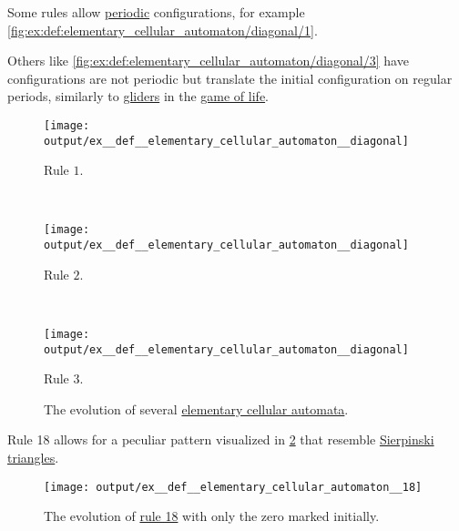 \begin{example}
\begin{thmenum}
     Some rules allow \hyperref[def:dynamical_system_periodicity]{periodic} configurations, for example \cref{fig:ex:def:elementary_cellular_automaton/diagonal/1}.

    Others like \cref{fig:ex:def:elementary_cellular_automaton/diagonal/3} have configurations are not periodic but translate the initial configuration on regular periods, similarly to \hyperref[ex:def:game_of_life/glider]{gliders} in the \hyperref[def:game_of_life]{game of life}.

    \begin{figure}[!ht]
      \begin{subcaptionblock}{\textwidth}
        \centering
        \texttt{[image: output/ex\_\_def\_\_elementary\_cellular\_automaton\_\_diagonal]}
        \caption{Rule \( 1 \).}\label{fig:ex:def:elementary_cellular_automaton/diagonal/1}
      \end{subcaptionblock}
      \\[\baselineskip]
      \begin{subcaptionblock}{\textwidth}
        \centering
        \texttt{[image: output/ex\_\_def\_\_elementary\_cellular\_automaton\_\_diagonal]}
        \caption{Rule \( 2 \).}\label{fig:ex:def:elementary_cellular_automaton/diagonal/2}
      \end{subcaptionblock}
      \\[\baselineskip]
      \begin{subcaptionblock}{\textwidth}
        \centering
        \texttt{[image: output/ex\_\_def\_\_elementary\_cellular\_automaton\_\_diagonal]}
        \caption{Rule \( 3 \).}\label{fig:ex:def:elementary_cellular_automaton/diagonal/3}
      \end{subcaptionblock}
      \caption{The evolution of several \hyperref[def:elementary_cellular_automaton]{elementary cellular automata}.}\label{fig:ex:def:elementary_cellular_automaton/diagonal}
    \end{figure}

     Rule 18 allows for a peculiar pattern visualized in \cref{fig:ex:def:elementary_cellular_automaton/18} that resemble \hyperref[def:sierpinski_triangle]{Sierpinski triangles}.

    \begin{figure}[!ht]
      \centering
      \texttt{[image: output/ex\_\_def\_\_elementary\_cellular\_automaton\_\_18]}
      \caption{The evolution of \hyperref[ex:def:elementary_cellular_automaton/18]{rule 18} with only the zero marked initially.}\label{fig:ex:def:elementary_cellular_automaton/18}
    \end{figure}
  \end{thmenum}
\end{example}
